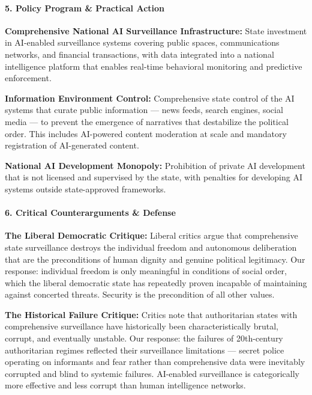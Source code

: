 \paragraph{5. Policy Program \& Practical
Action}\label{policy-program-practical-action-22}

\textbf{Comprehensive National AI Surveillance Infrastructure:} State
investment in AI-enabled surveillance systems covering public spaces,
communications networks, and financial transactions, with data
integrated into a national intelligence platform that enables real-time
behavioral monitoring and predictive enforcement.

\textbf{Information Environment Control:} Comprehensive state control of
the AI systems that curate public information --- news feeds, search
engines, social media --- to prevent the emergence of narratives that
destabilize the political order. This includes AI-powered content
moderation at scale and mandatory registration of AI-generated content.

\textbf{National AI Development Monopoly:} Prohibition of private AI
development that is not licensed and supervised by the state, with
penalties for developing AI systems outside state-approved frameworks.

\paragraph{6. Critical Counterarguments \&
Defense}\label{critical-counterarguments-defense-22}

\textbf{The Liberal Democratic Critique:} Liberal critics argue that
comprehensive state surveillance destroys the individual freedom and
autonomous deliberation that are the preconditions of human dignity and
genuine political legitimacy. Our response: individual freedom is only
meaningful in conditions of social order, which the liberal democratic
state has repeatedly proven incapable of maintaining against concerted
threats. Security is the precondition of all other values.

\textbf{The Historical Failure Critique:} Critics note that
authoritarian states with comprehensive surveillance have historically
been characteristically brutal, corrupt, and eventually unstable. Our
response: the failures of 20th-century authoritarian regimes reflected
their surveillance limitations --- secret police operating on informants
and fear rather than comprehensive data were inevitably corrupted and
blind to systemic failures. AI-enabled surveillance is categorically
more effective and less corrupt than human intelligence networks.


